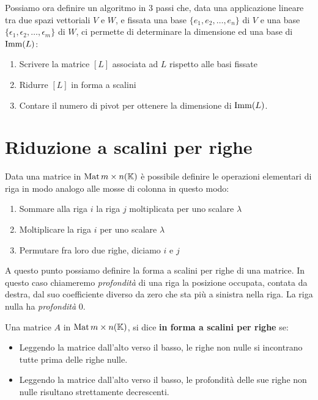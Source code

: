 \begin{observation}
	Possiamo ora definire un algoritmo in 3 passi che, data una
	applicazione lineare tra due spazi vettoriali $V$ e $W$, e fissata una base
	$\{e_1, e_2, \dots, e_n\}$ di $V$ e una base
	$\{\epsilon_1, \epsilon_2, \dots, \epsilon_m\}$ di $W$, ci permette di
	determinare la dimensione ed una base di $\operatorname{Imm}(L)$:
	\begin{enumerate}
		\item Scrivere la matrice $[L]$ associata ad $L$ rispetto alle basi
		      fissate
		\item Ridurre $[L]$ in forma a scalini
		\item Contare il numero di pivot per ottenere la dimensione di $\operatorname{Imm}(L)$.
	\end{enumerate}
\end{observation}

\section{Riduzione a scalini per righe}
Data una matrice in $\operatorname{Mat}{m \times n}(\mathbb{K})$ è possibile definire le
operazioni elementari di riga in modo analogo alle mosse di colonna in questo
modo:
\begin{enumerate}
	\item Sommare alla riga $i$ la riga $j$ moltiplicata per uno scalare $\lambda$
	\item Moltiplicare la riga $i$ per uno scalare $\lambda$
	\item Permutare fra loro due righe, diciamo $i$ e $j$
\end{enumerate}
A questo punto possiamo definire la forma a scalini per righe di una matrice.
In questo caso chiameremo \emph{profondità} di una riga la posizione occupata,
contata da destra, dal suo coefficiente diverso da zero che sta più a sinistra
nella riga. La riga nulla ha \emph{profondità} 0.

\begin{definition}
	Una matrice $A$ in $\operatorname{Mat}{m \times n}(\mathbb{K})$, si dice \textbf{in forma
		a scalini per righe} se:
	\begin{itemize}
		\item Leggendo la matrice dall'alto verso il basso, le righe non nulle si
		      incontrano tutte prima delle righe nulle.
		\item Leggendo la matrice dall'alto verso il basso, le profondità
		      delle sue righe non nulle risultano strettamente decrescenti.
	\end{itemize}
\end{definition}


